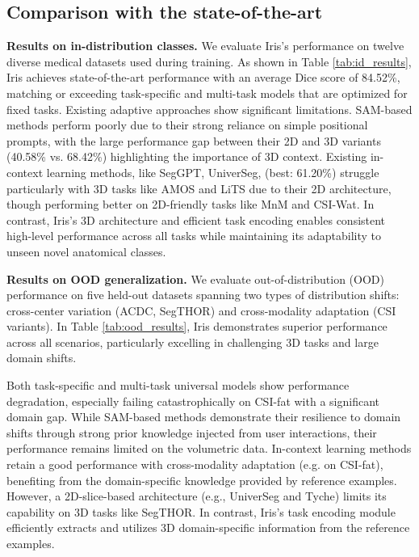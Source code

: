 \subsection{Comparison with the state-of-the-art}

\noindent\textbf{Results on in-distribution classes.}
We evaluate Iris's performance on twelve diverse medical datasets used during training. As shown in Table \ref{tab:id_results}, Iris achieves state-of-the-art performance with an average Dice score of 84.52\%, matching or exceeding task-specific and multi-task models that are optimized for fixed tasks.
Existing adaptive approaches show significant limitations. SAM-based methods perform poorly due to their strong reliance on simple positional prompts, with the large performance gap between their 2D and 3D variants (40.58\% vs. 68.42\%) highlighting the importance of 3D context. Existing in-context learning methods, like SegGPT, UniverSeg, (best: 61.20\%) struggle particularly with 3D tasks like AMOS and LiTS due to their 2D architecture, though performing better on 2D-friendly tasks like MnM and CSI-Wat. In contrast, Iris's 3D architecture and efficient task encoding enables consistent high-level performance across all tasks while maintaining its adaptability to unseen novel anatomical classes.







\noindent\textbf{Results on OOD generalization.} We evaluate out-of-distribution (OOD) performance on five held-out datasets spanning two types of distribution shifts: cross-center variation (ACDC, SegTHOR) and cross-modality adaptation (CSI variants). In Table \ref{tab:ood_results}, Iris demonstrates superior performance across all scenarios, particularly excelling in challenging 3D tasks and large domain shifts.

Both task-specific and multi-task universal models show performance degradation, especially failing catastrophically on CSI-fat with a significant domain gap. While SAM-based methods demonstrate their resilience to domain shifts through strong prior knowledge injected from user interactions, their performance remains limited on the volumetric data.
In-context learning methods retain a good performance with cross-modality adaptation (e.g. on CSI-fat), benefiting from the domain-specific knowledge provided by reference examples. However, a 2D-slice-based architecture (e.g., UniverSeg and Tyche) limits its capability on 3D tasks like SegTHOR. In contrast, Iris's task encoding module efficiently extracts and utilizes 3D domain-specific information from the reference examples. 


